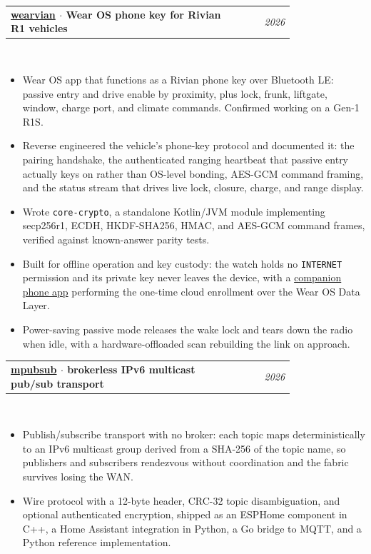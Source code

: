 \documentclass[10.5pt]{article}
\makeatletter
\newcommand{\role}[2]{%
  \noindent\begin{tabular*}{\linewidth}{@{}p{0.79\linewidth}@{\extracolsep{\fill}}r@{}}
  \textbf{#1} & \textit{#2}
  \end{tabular*}\\[0.5pt]
}
\makeatother
\begin{document}
\vspace{1pt}
\role{\href{https://github.com/pgenera/wearvian}{wearvian} $\cdot$ Wear OS phone key for Rivian R1 vehicles}{2026}
\begin{itemize}
  \item Wear OS app that functions as a Rivian phone key over Bluetooth LE: passive entry and drive enable by proximity, plus lock, frunk, liftgate, window, charge port, and climate commands. Confirmed working on a Gen-1 R1S.
  \item Reverse engineered the vehicle's phone-key protocol and documented it: the pairing handshake, the authenticated ranging heartbeat that passive entry actually keys on rather than OS-level bonding, AES-GCM command framing, and the status stream that drives live lock, closure, charge, and range display.
  \item Wrote \texttt{core-crypto}, a standalone Kotlin/JVM module implementing secp256r1, ECDH, HKDF-SHA256, HMAC, and AES-GCM command frames, verified against known-answer parity tests.
  \item Built for offline operation and key custody: the watch holds no \texttt{INTERNET} permission and its private key never leaves the device, with a \href{https://github.com/pgenera/wearvian-companion}{companion phone app} performing the one-time cloud enrollment over the Wear OS Data Layer.
  \item Power-saving passive mode releases the wake lock and tears down the radio when idle, with a hardware-offloaded scan rebuilding the link on approach.
\end{itemize}

\vspace{2pt}
\role{\href{https://github.com/pgenera/esphome-mpubsub}{mpubsub} $\cdot$ brokerless IPv6 multicast pub/sub transport}{2026}
\begin{itemize}
  \item Publish/subscribe transport with no broker: each topic maps deterministically to an IPv6 multicast group derived from a SHA-256 of the topic name, so publishers and subscribers rendezvous without coordination and the fabric survives losing the WAN.
  \item Wire protocol with a 12-byte header, CRC-32 topic disambiguation, and optional authenticated encryption, shipped as an ESPHome component in C++, a Home Assistant integration in Python, a Go bridge to MQTT, and a Python reference implementation.
\end{itemize}
\end{document}

